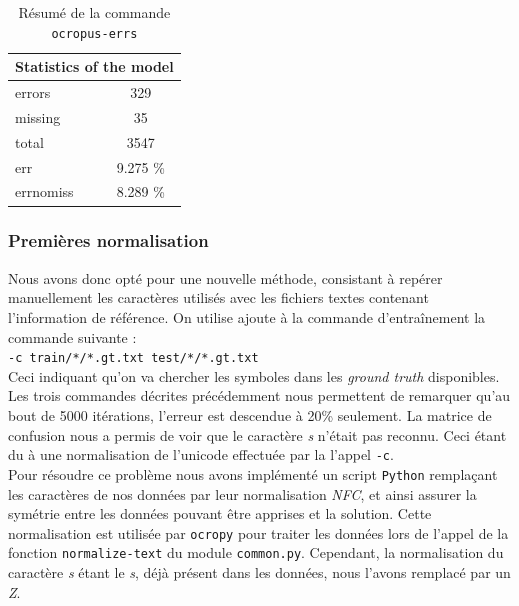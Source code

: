 \documentclass{article}
\newenvironment{oldstyle}{%
    \renewcommand\rmdefault{jkplvos}%
  \renewcommand\sfdefault{jkpssvos}%
  \renewcommand\ttdefault{jkpttvos}%
  \normalfont
}{}
\newcommand\s{\begin{oldstyle}s\end{oldstyle}}
\begin{document}
\begin{table}[!h]
    \centering
    \begin{tabular}{|l|l|lc|l|l|}
        \hline
        \multicolumn{6}{|c|}{\cellcolor[gray]{0.8}Statistics of the model}                   \\ \hline
        \multicolumn{3}{|l|}{errors}    & \multicolumn{3}{c|}{329}      \\ \hline
        \multicolumn{3}{|l|}{missing}   & \multicolumn{3}{c|}{35}       \\ \hline
        \multicolumn{3}{|l|}{total}     & \multicolumn{3}{c|}{3547}     \\ \hline
        \multicolumn{3}{|l|}{err}       & \multicolumn{3}{c|}{9.275 \%} \\ \hline
        \multicolumn{3}{|l|}{errnomiss} & \multicolumn{3}{c|}{8.289 \%} \\ \hline
    \end{tabular}
    \caption{Résumé de la commande \texttt{ocropus-errs}}
    \label{t1}
\end{table}



\subsubsection{Premières normalisation}

Nous avons donc opté pour une nouvelle méthode, consistant à repérer manuellement les caractères utilisés avec les fichiers textes contenant l'information de référence.
On utilise ajoute à la commande d'entraînement la commande suivante : \\
\texttt{-c train/*/*.gt.txt test/*/*.gt.txt} \\
Ceci indiquant qu'on va chercher les symboles dans les \textit{ground truth} disponibles.
Les trois commandes décrites précédemment nous permettent de remarquer qu'au bout de 5000 itérations, l'erreur est descendue à 20\% seulement. La matrice de confusion nous a permis de voir que le caractère \textit{\s} n'était pas reconnu. Ceci étant du à une normalisation de l'unicode effectuée par la l'appel \texttt{-c}. \\
Pour résoudre ce problème nous avons implémenté un script \texttt{Python} remplaçant les caractères de nos données par leur normalisation \textit{NFC}, et ainsi assurer la symétrie entre les données pouvant être apprises et la solution. Cette normalisation est utilisée par \texttt{ocropy} pour traiter les données lors de l'appel de la fonction \texttt{normalize-text} du module \texttt{common.py}. Cependant, la normalisation du caractère \textit{\s} étant le \textit{s}, déjà présent dans les données, nous l'avons remplacé par un \textit{Z}.
\end{document}
